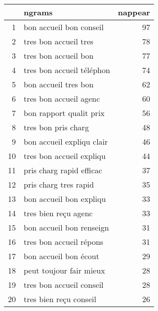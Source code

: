 \begin{tabular}{|r|l|r|}
  \hline
 & ngrams & nappear \\ 
  \hline
1 & bon accueil bon conseil &  97 \\ 
  2 & tres bon accueil tres &  78 \\ 
  3 & tres bon accueil bon &  77 \\ 
  4 & tres bon accueil téléphon &  74 \\ 
  5 & bon accueil tres bon &  62 \\ 
  6 & tres bon accueil agenc &  60 \\ 
  7 & bon rapport qualit prix &  56 \\ 
  8 & tres bon pris charg &  48 \\ 
  9 & bon accueil expliqu clair &  46 \\ 
  10 & tres bon accueil expliqu &  44 \\ 
  11 & pris charg rapid efficac &  37 \\ 
  12 & pris charg tres rapid &  35 \\ 
  13 & bon accueil bon expliqu &  33 \\ 
  14 & tres bien reçu agenc &  33 \\ 
  15 & bon accueil bon renseign &  31 \\ 
  16 & tres bon accueil répons &  31 \\ 
  17 & bon accueil bon écout &  29 \\ 
  18 & peut toujour fair mieux &  28 \\ 
  19 & tres bon accueil conseil &  28 \\ 
  20 & tres bien reçu conseil &  26 \\ 
   \hline
\end{tabular}
